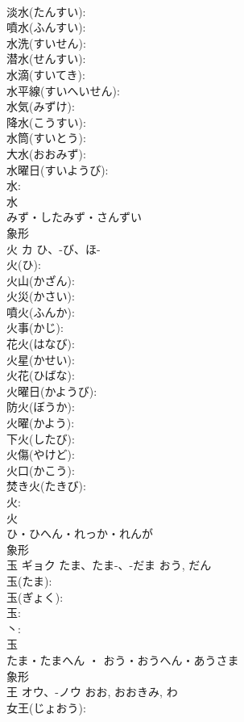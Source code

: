\documentclass[8pt]{extreport}
\begin{document}
\begin{CJK}{UTF8}{min}
\\	淡水(たんすい): 
\\	噴水(ふんすい): 
\\	水洗(すいせん): 
\\	潜水(せんすい): 
\\	水滴(すいてき): 
\\	水平線(すいへいせん): 
\\	水気(みずけ): 
\\	降水(こうすい): 
\\	水筒(すいとう): 
\\	大水(おおみず): 
\\	水曜日(すいようび): 
\\	水: 
\\	水	
\\	みず・したみず・さんずい	
\\	象形 
\\	火	カ	ひ、-び、ほ-		
\\	火(ひ): 
\\	火山(かざん): 
\\	火災(かさい): 
\\	噴火(ふんか): 
\\	火事(かじ): 
\\	花火(はなび): 
\\	火星(かせい): 
\\	火花(ひばな): 
\\	火曜日(かようび): 
\\	防火(ぼうか): 
\\	火曜(かよう): 
\\	下火(したび): 
\\	火傷(やけど): 
\\	火口(かこう): 
\\	焚き火(たきび): 
\\	火: 
\\	火	
\\	ひ・ひへん・れっか・れんが	
\\	象形 
\\	玉	ギョク	たま、たま-、-だま	おう, だん	
\\	玉(たま): 
\\	玉(ぎょく): 
\\	玉: 
\\	丶: 
\\	玉	
\\	たま・たまへん ・ おう・おうへん・あうさま	
\\	象形 
\\	王	オウ、-ノウ		おお, おおきみ, わ	
\\	女王(じょおう): 

\end{CJK}
\end{document}
